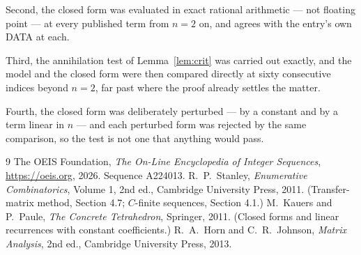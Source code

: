 \documentclass[11pt,a4paper]{article}
\theoremstyle{plain}
\theoremstyle{definition}
\begin{document}
Second, the closed form was evaluated in exact rational arithmetic --- not floating point ---
at every published term from $n=2$ on, and agrees with the entry's own DATA at each.

Third, the annihilation test of Lemma~\ref{lem:crit} was carried out exactly, and the model
and the closed form were then compared directly at sixty consecutive indices beyond
$n=2$, far past where the proof already settles the matter.

Fourth, the closed form was deliberately perturbed --- by a constant and by a term linear in
$n$ --- and each perturbed form was rejected by the same comparison, so the test is not one
that anything would pass.

\begin{thebibliography}{9}
 The OEIS Foundation, \emph{The On-Line Encyclopedia of Integer
Sequences}, \url{https://oeis.org}, 2026. Sequence A224013.
 R.~P.~Stanley, \emph{Enumerative Combinatorics}, Volume 1, 2nd ed.,
Cambridge University Press, 2011. (Transfer-matrix method, Section 4.7; $C$-finite sequences,
Section 4.1.)
 M.~Kauers and P.~Paule, \emph{The Concrete Tetrahedron}, Springer, 2011.
(Closed forms and linear recurrences with constant coefficients.)
 R.~A.~Horn and C.~R.~Johnson, \emph{Matrix Analysis}, 2nd ed., Cambridge
University Press, 2013.
\end{thebibliography}
\end{document}
